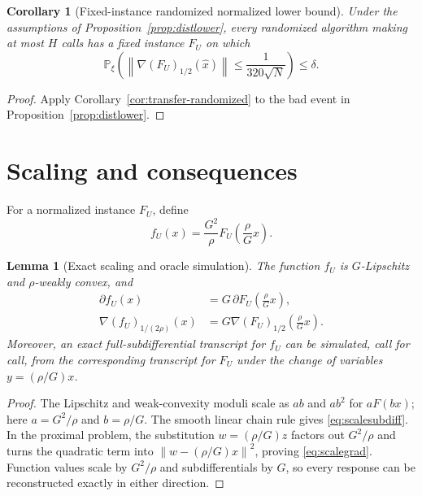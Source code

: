 \documentclass[11pt,a4paper]{article}
\newcommand{\Prob}{\mathbb{P}}
\newcommand{\norm}[1]{\left\lVert #1\right\rVert}
\newtheorem{lemma}[theorem]{Lemma}
\newtheorem{corollary}[theorem]{Corollary}
\theoremstyle{definition}
\numberwithin{equation}{section}
\begin{document}
\begin{corollary}[Fixed-instance randomized normalized lower bound]\label{cor:yao}
Under the assumptions of Proposition~\ref{prop:distlower}, every randomized algorithm making at most $H$ calls has a fixed instance $F_U$ on which
\[
 \Prob_\xi\!\left(
 \norm{\nabla(F_U)_{1/2}(\widehat x)}
 \le\frac1{320\sqrt N}
 \right)\le\delta.
\]
\end{corollary}

\begin{proof}
Apply Corollary~\ref{cor:transfer-randomized} to the bad event in Proposition~\ref{prop:distlower}.
\end{proof}

\section{Scaling and consequences}\label{sec:scaling}

For a normalized instance $F_U$, define
\begin{equation}\label{eq:scaling}
 f_U(x)=\frac{G^2}{\rho}
 F_U\!\left(\frac{\rho}{G}x\right).
\end{equation}

\begin{lemma}[Exact scaling and oracle simulation]\label{lem:scaling}
The function $f_U$ is $G$-Lipschitz and $\rho$-weakly convex, and
\begin{align}
 \partial f_U(x)
 &=G\,\partial F_U\!\left(\frac{\rho}{G}x\right),\label{eq:scalesubdiff}\\
 \nabla(f_U)_{1/(2\rho)}(x)
 &=G\nabla(F_U)_{1/2}\!\left(\frac{\rho}{G}x\right).\label{eq:scalegrad}
\end{align}
Moreover, an exact full-subdifferential transcript for $f_U$ can be simulated, call for call, from the corresponding transcript for $F_U$ under the change of variables $y=(\rho/G)x$.
\end{lemma}

\begin{proof}
The Lipschitz and weak-convexity moduli scale as $ab$ and $ab^2$ for $aF(bx)$; here $a=G^2/\rho$ and $b=\rho/G$.  The smooth linear chain rule gives \eqref{eq:scalesubdiff}.  In the proximal problem, the substitution $w=(\rho/G)z$ factors out $G^2/\rho$ and turns the quadratic term into $\norm{w-(\rho/G)x}^2$, proving \eqref{eq:scalegrad}.  Function values scale by $G^2/\rho$ and subdifferentials by $G$, so every response can be reconstructed exactly in either direction.
\end{proof}
\end{document}
